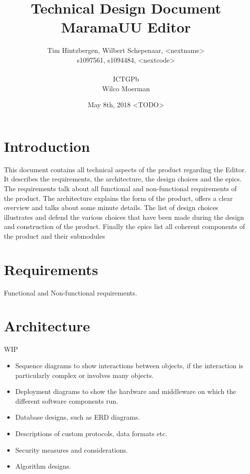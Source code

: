 \documentclass[10pt]{extarticle} %
\title{\huge Technical Design Document MaramaUU Editor}
\author{Tim Hintzbergen, Wilbert Schepenaar, <nextname>    \\s1097561, s1094484, <nextcode>
\\\\ICTGPb
\\Wilco Moerman}
\date{May 8th, 2018 <TODO>}
\begin{document}
    \maketitle
    \thispagestyle{empty}
    \newpage
    \newpage
    \setcounter{page}{1}
    \section {Introduction}
    This document contains all technical aspects of the product regarding the Editor.
    It describes the requirements, the architecture, the design choices and the epics.
    The requirements talk about all functional and non-functional requirements of the product.
    The architecture explains the form of the product, offers a clear overview and talks about some minute details.
    The list of design choices illustrates and defend the various choices that have been made during the design and construction of the product.
    Finally the epics list all coherent components of the product and their submodules
    \newpage

    \tableofcontents{}
    \newpage

    \section{Requirements}
    Functional and Non-functional requirements.
    \newpage

    \section{Architecture}
    WIP
    \begin{itemize}
              \item Sequence diagrams to show interactions between objects, if the interaction is particularly complex or involves many objects.
              \item Deployment diagrams to show the hardware and middleware on which the different software components run.
              \item Database designs, such as ERD diagrams.
              \item Descriptions of custom protocols, data formats etc.
              \item Security measures and considerations.
              \item Algorithm designs.
    \end{itemize}
\end{document}
